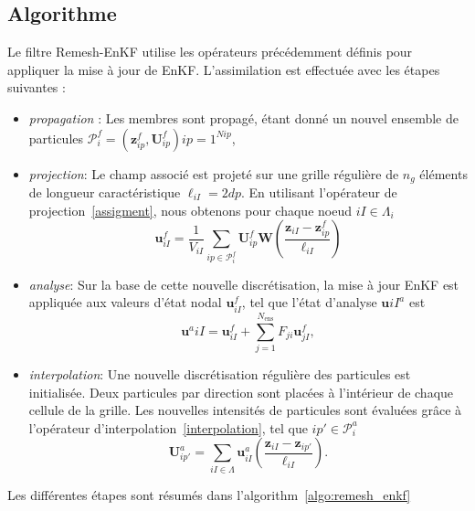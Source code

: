 \subsection*{Algorithme}

Le filtre Remesh-EnKF utilise les opérateurs précédemment définis pour appliquer la mise à jour de EnKF. L'assimilation est effectuée avec les étapes suivantes :

\begin{itemize}
    \item \textit{propagation} : Les membres sont propagé, étant donné un nouvel ensemble de particules $\mathcal{P}^f_i = {(\bm z^f_{ip}, \bm U^f_{ip})}{ip = 1}^{N{ip}}$,
    \item \textit{projection}: Le champ associé est projeté sur une grille régulière de $n_g$ éléments de longueur caractéristique $\ell_{iI}= 2dp$. En utilisant l'opérateur de projection~\ref{assigment}, nous obtenons pour chaque noeud $iI \in \Lambda_{i}$
          \begin{equation*}
              \bm{u}^f_{iI} = \frac1{V_{iI}} \sum_{ip \in \mathcal P^f_i} \bm U^f_{ip} \bm W \left(\frac{\bm z_{iI} - \bm z^f_{ip}}{\ell_{iI}} \right)
          \end{equation*}
    \item \textit{analyse}: Sur la base de cette nouvelle discrétisation, la mise à jour EnKF est appliquée aux valeurs d'état nodal $\bm{u}^f_{iI}$, tel que l'état d'analyse $\bm{u}{iI}^a$ est
          \begin{equation*}
              \bm{u}^a{iI} = \bm{u}^f_{iI} + \sum_{j=1}^{N_{\text{ens}}} F_{ji} \bm{u}^f_{jI},
          \end{equation*}
    \item \textit{interpolation}: Une nouvelle discrétisation régulière des particules est initialisée. Deux particules par direction sont placées à l'intérieur de chaque cellule de la grille. Les nouvelles intensités de particules sont évaluées grâce à l'opérateur d'interpolation~\ref{interpolation}, tel que $ip' \in \mathcal P_i^a$
          \begin{equation*}
              \bm U_{ip'}^a = \sum_{iI \in \Lambda} \bm u^a_{iI} \left(\frac{\bm z_{iI} - \bm z_{ip'}}{\ell_{iI}} \right).
          \end{equation*}
\end{itemize}

Les différentes étapes sont résumés dans l'algorithm~\ref{algo:remesh_enkf}

